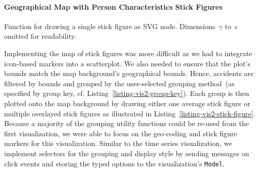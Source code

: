 \paragraph{Geographical Map with Person Characteristics Stick Figures}
\begin{listing}
    
    \caption{Mapper from the \lstinline{Accident} to its group key in preparation to grouping the accidents by grid or political region.}
    \label{listing-vis2-group-key}
\end{listing}
\begin{listing}
    
    \caption{Function for drawing a single stick figure as SVG node. Dimensions~\(\gamma\) to~\(\epsilon\) omitted for readability.}
    \label{listing-vis2-stick-figure}
\end{listing}
Implementing the map of stick figures was more difficult as we had to integrate icon-based markers into a scatterplot. We also needed to ensure that the plot's bounds match the map background's geographical bounds.
Hence, accidents are \Ni filtered by bounds and \Nii grouped by the user-selected grouping method~(as specified by group key, cf. Listing~\ref{listing-vis2-group-key}). Each group is then plotted onto the map background by drawing either one average stick figure or multiple overlayed stick figures as illustrated in Listing~\ref{listing-vis2-stick-figure}. Because a majority of the grouping utility functions could be re-used from the first visualization, we were able to focus on the geo-coding and stick figure markers for this visualization. Similar to the time series visualization, we implement selectors for the grouping and display style by sending messages on click events and storing the typed options to the visualization's \lstinline{Model}.

